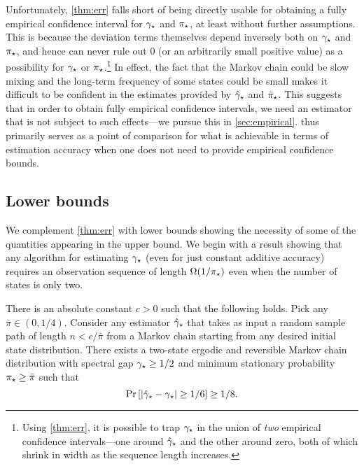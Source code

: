 Unfortunately, \cref{thm:err} falls short of being directly
usable for obtaining a fully empirical confidence interval for $\gamma_{\star}$
and $\pi_{\star}$, at least without further assumptions.
This is because the deviation terms themselves depend inversely both
on $\gamma_{\star}$ and $\pi_{\star}$, and hence can never rule out $0$ (or an
arbitrarily small positive value) as a possibility for $\gamma_{\star}$ or
$\pi_{\star}$.\footnote{%
  Using \cref{thm:err}, it is possible to trap $\gamma_{\star}$ in the
  union of \emph{two} empirical confidence intervals---one around
  $\hat\gamma_{\star}$ and the other around zero, both of which shrink in width
  as the sequence length increases.%
}
In effect, the fact that the Markov chain could be slow mixing and the
long-term frequency of some states could be small makes it difficult
to be confident in the estimates provided by $\hat\gamma_{\star}$ and
$\hat\pi_{\star}$.
This suggests that in order to obtain fully empirical confidence
intervals, we need an estimator that is not subject to such
effects---we pursue this in \cref{sec:empirical}.
 thus primarily serves as a point of comparison
for what is achievable in terms of estimation accuracy when one does
not need to provide empirical confidence bounds.

\subsection{Lower bounds}

We complement \cref{thm:err} with lower bounds showing the
necessity of some of the quantities appearing in the upper bound.
We begin with a result showing that any algorithm for estimating
$\gamma_{\star}$ (even for just constant additive accuracy) requires an
observation sequence of length $\Omega(1/\pi_{\star})$
even when the number of states is only two.

\begin{theorem}
  \label{thm:lb-pimin}
  There is an absolute constant $c>0$ such that the following holds.
  Pick any $\bar\pi \in (0,1/4)$.
  Consider any estimator $\hat\gamma_{\star}$ that takes as input a random sample
  path of length $n < c/\bar\pi$ from a Markov chain starting from any
  desired initial state distribution.
  There exists a two-state ergodic and reversible Markov chain
  distribution with spectral gap $\gamma_{\star} \geq 1/2$ and minimum
  stationary probability $\pi_{\star} \geq \bar\pi$ such that
  \[
    \Pr\left[ |\hat\gamma_{\star} - \gamma_{\star}| \geq 1/6 \right] \geq 1/8 .
  \]
\end{theorem}

